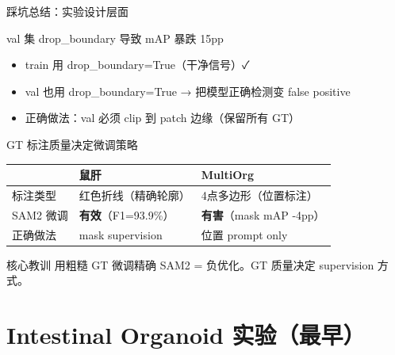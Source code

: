 \documentclass[aspectratio=169, 10pt]{beamer}
\begin{document}
\begin{frame}{踩坑总结：实验设计层面}
  \begin{block}{val 集 drop\_boundary 导致 mAP 暴跌 15pp}
    \begin{itemize}
      \item train 用 drop\_boundary=True（干净信号）✓
      \item val 也用 drop\_boundary=True → \alert{把模型正确检测变 false positive}
      \item 正确做法：val 必须 clip 到 patch 边缘（保留所有 GT）
    \end{itemize}
  \end{block}
  \vspace{0em}
  \begin{block}{GT 标注质量决定微调策略}
    \begin{tabular}{p{2.5cm}p{4cm}p{4cm}}
      \toprule
      & \textbf{鼠肝} & \textbf{MultiOrg} \\
      \midrule
      标注类型 & 红色折线（精确轮廓） & 4点多边形（位置标注） \\
      SAM2 微调 & \textbf{有效}（F1=93.9\%） & \textbf{有害}（mask mAP -4pp） \\
      正确做法 & mask supervision & 位置 prompt only \\
      \bottomrule
    \end{tabular}
  \end{block}
  \vspace{0em}
  \begin{alertblock}{核心教训}
    用粗糙 GT 微调精确 SAM2 = 负优化。GT 质量决定 supervision 方式。
  \end{alertblock}
\end{frame}

\section{Intestinal Organoid 实验（最早）}
\end{document}

